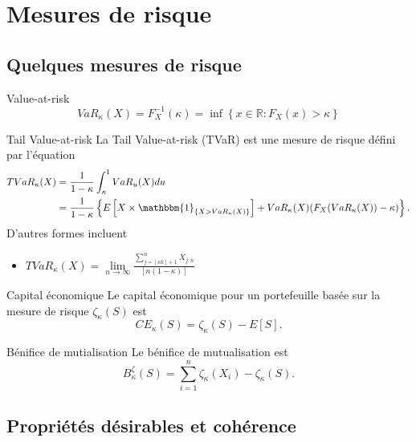 \chapter{Mesures de risque}

\section{Quelques mesures de risque}

\begin{definition}{Value-at-risk}{}
	$$VaR_\kappa (X) = F^{-1}_X(\kappa) = \inf \left\{x\in \mathbb{R} : F_X(x) > \kappa \right\}$$
\end{definition}

\begin{definition}{Tail Value-at-risk}{}
	La Tail Value-at-risk (TVaR) est une mesure de risque défini par l'équation
	\begin{align*}
		TVaR_\kappa (X) & = \frac{1}{1 - \kappa} \int_{\kappa}^{1} VaR_u(X)du                                                                           \\
		                & = \frac{1}{1 - \kappa} \left\{E\left[X \times \mathbbm{1}_{\{X > VaR_\kappa(X)\}}\right] + VaR_\kappa(X)(F_X(VaR_\kappa(X)) - \kappa)\right\}.
	\end{align*}
	D'autres formes incluent
	\begin{itemize}
		\item $\displaystyle TVaR_\kappa(X) = \lim\limits_{n\to\infty}\frac{\sum_{j = [nk]+ 1}^{n}X_{j:n}}{[n(1-\kappa)]}$
	\end{itemize}
	
\end{definition}

\begin{definition}{Capital économique}{}
	Le capital économique pour un portefeuille basée sur la mesure de risque $\zeta_\kappa(S)$ est 
	$$CE_\kappa(S) = \zeta_\kappa(S) - E[S].$$
\end{definition}

\begin{definition}{Bénifice de mutialisation}{}
	Le bénifice de mutualisation est 
	$$B_\kappa^\zeta(S) = \sum_{i = 1}^{n}\zeta_\kappa(X_i) - \zeta_\kappa(S).$$
\end{definition}

\section{Propriétés désirables et cohérence}

